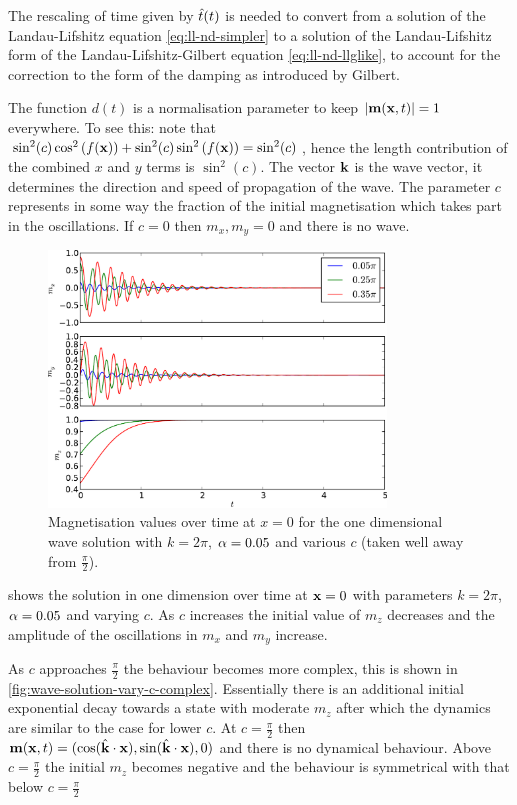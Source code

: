 The rescaling of time given by $\hat{t}(t)$ is needed to convert from a solution of the Landau-Lifshitz equation \cref{eq:ll-nd-simpler} to a solution of the Landau-Lifshitz form of the Landau-Lifshitz-Gilbert equation \cref{eq:ll-nd-llglike}, \ie to account for the correction to the form of the damping as introduced by Gilbert.

The function $d(t)$ is a normalisation parameter to keep $\left|{\boldsymbol{\mathrm{m}}(\boldsymbol{\mathrm{x}}, t)} \right| = 1$ everywhere.
To see this: note that $\sin^2(c) \cos^2{\left( f(\boldsymbol{\mathrm{x}}) \right)} + \sin^2(c) \sin^2{\left( f(\boldsymbol{\mathrm{x}}) \right)} = \sin^2(c)$, hence the length contribution of the combined $x$ and $y$ terms is $\sin^2(c)$.
The vector $\boldsymbol{\mathrm{k}}$ is the wave vector, it determines the direction and speed of propagation of the wave.
The parameter $c$ represents in some way the fraction of the initial magnetisation which takes part in the oscillations.
If $c = 0$ then $m_x, m_y = 0$ and there is no wave.

\begin{figure}
  \centering
  \includegraphics[width=0.8\textwidth]{plots/wave_exact_solution_parameters/exact_solution_parameters.pdf}
  \caption{Magnetisation values over time at $x=0$ for the one dimensional wave solution with $k = 2\pi$, $\alpha = 0.05$ and various $c$ (taken well away from $\frac{\pi}{2}$).}
  \label{fig:wave-solution-vary-c}
\end{figure}

 shows the solution in one dimension over time at $\boldsymbol{\mathrm{x}} = 0$ with parameters $k = 2\pi$, $\alpha = 0.05$ and varying $c$.
As $c$ increases the initial value of $m_z$ decreases and the amplitude of the oscillations in $m_x$ and $m_y$ increase.

As $c$ approaches $\frac{\pi}{2}$ the behaviour becomes more complex, this is shown in \cref{fig:wave-solution-vary-c-complex}.
Essentially there is an additional initial exponential decay towards a state with moderate $m_z$ after which the dynamics are similar to the case for lower $c$.
At $c=\frac{\pi}{2}$ then $\boldsymbol{\mathrm{m}}(\boldsymbol{\mathrm{x}}, t)= (\cos({\hat{\mathbf{k}}}\cdot\boldsymbol{\mathrm{x}}), \sin({\hat{\mathbf{k}}}\cdot\boldsymbol{\mathrm{x}}), 0)$ and there is no dynamical behaviour.
Above $c=\frac{\pi}{2}$ the initial $m_z$ becomes negative and the behaviour is symmetrical with that below $c=\frac{\pi}{2}$

